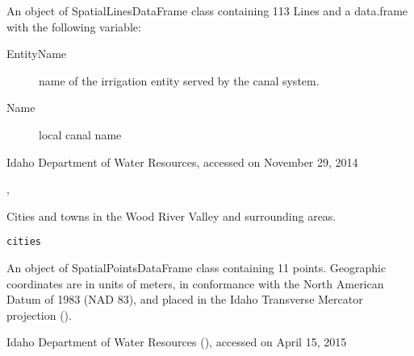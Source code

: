 \documentclass[a4paper]{book}
\begin{document}
%
\begin{Format}
An object of SpatialLinesDataFrame class containing
113 Lines and a data.frame with the following variable:
\begin{description}

\item[EntityName] name of the irrigation entity served by the canal system.
\item[Name] local canal name

\end{description}
\end{Format}
%
\begin{Source}\relax
Idaho Department of Water Resources, accessed on November 29, 2014
\end{Source}
%
\begin{SeeAlso}\relax
{}, 
\end{SeeAlso}
%
\begin{Examples}
\end{Examples}
%
\begin{Description}\relax
Cities and towns in the Wood River Valley and surrounding areas.
\end{Description}
%
\begin{Usage}
\begin{verbatim}
cities
\end{verbatim}
\end{Usage}
%
\begin{Format}
An object of SpatialPointsDataFrame class containing 11 points.
Geographic coordinates are in units of meters, in conformance with the
North American Datum of 1983 (NAD 83), and placed in the
Idaho Transverse Mercator projection ().
\end{Format}
%
\begin{Source}\relax
Idaho Department of Water Resources
(),
accessed on April 15, 2015
\end{Source}
%
\begin{Examples}
\end{Examples}
\end{document}
